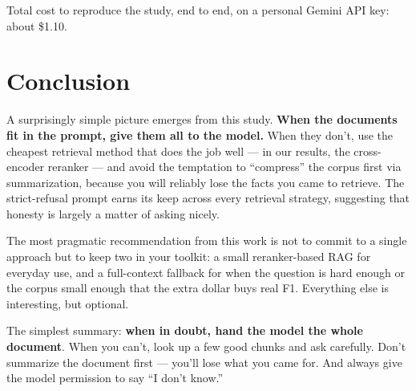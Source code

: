 \documentclass[11pt,a4paper]{article}
\begin{document}
Total cost to reproduce the study, end to end, on a personal Gemini API key: about \$1.10.

\section{Conclusion}

A surprisingly simple picture emerges from this study. \textbf{When the documents fit in the prompt, give them all to the model.} When they don't, use the cheapest retrieval method that does the job well — in our results, the cross-encoder reranker — and avoid the temptation to ``compress'' the corpus first via summarization, because you will reliably lose the facts you came to retrieve. The strict-refusal prompt earns its keep across every retrieval strategy, suggesting that honesty is largely a matter of asking nicely.

The most pragmatic recommendation from this work is not to commit to a single approach but to keep two in your toolkit: a small reranker-based RAG for everyday use, and a full-context fallback for when the question is hard enough or the corpus small enough that the extra dollar buys real F1. Everything else is interesting, but optional.

\begin{plainEnglish}
The simplest summary: \textbf{when in doubt, hand the model the whole document}. When you can't, look up a few good chunks and ask carefully. Don't summarize the document first — you'll lose what you came for. And always give the model permission to say ``I don't know.''
\end{plainEnglish}
\end{document}
